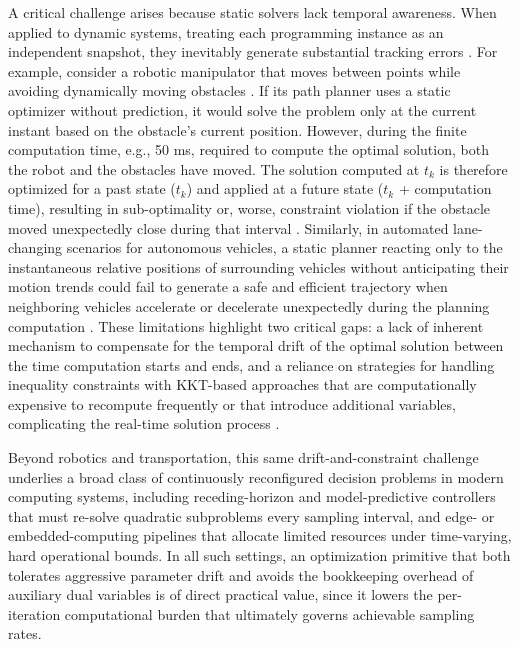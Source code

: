 \documentclass[fleqn,10pt]{wlscirep}
\begin{document}
A critical challenge arises because static solvers lack temporal awareness. When applied to dynamic systems, treating each programming instance as an independent snapshot, they inevitably generate substantial tracking errors \cite{S4456,nn34, S4fw4}. For example, consider a robotic manipulator that moves between points while avoiding dynamically moving obstacles \cite{rbmm,rbm3Rm}. If its path planner uses a static optimizer without prediction, it would solve the problem only at the current instant based on the obstacle's current position. However, during the finite computation time, e.g., 50 ms, required to compute the optimal solution, both the robot and the obstacles have moved. The solution computed at $t_k$ is therefore optimized for a past state ($t_k$) and applied at a future state ($t_k$ + computation time), resulting in sub-optimality or, worse, constraint violation if the obstacle moved unexpectedly close during that interval \cite{rbmmr4,xy111}. Similarly, in automated lane-changing scenarios for autonomous vehicles, a static planner reacting only to the instantaneous relative positions of surrounding vehicles without anticipating their motion trends could fail to generate a safe and efficient trajectory when neighboring vehicles accelerate or decelerate unexpectedly during the planning computation \cite{tiv124}. These limitations highlight two critical gaps: a lack of inherent mechanism to compensate for the temporal drift of the optimal solution between the time computation starts and ends, and a reliance on strategies for handling inequality constraints with KKT-based approaches that are computationally expensive to recompute frequently or that introduce additional variables, complicating the real-time solution process \cite{lfyy12,lj11}.

Beyond robotics and transportation, this same drift-and-constraint challenge underlies a broad class of continuously reconfigured decision problems in modern computing systems, including receding-horizon and model-predictive controllers that must re-solve quadratic subproblems every sampling interval, and edge- or embedded-computing pipelines that allocate limited resources under time-varying, hard operational bounds. In all such settings, an optimization primitive that both tolerates aggressive parameter drift and avoids the bookkeeping overhead of auxiliary dual variables is of direct practical value, since it lowers the per-iteration computational burden that ultimately governs achievable sampling rates.
\end{document}

